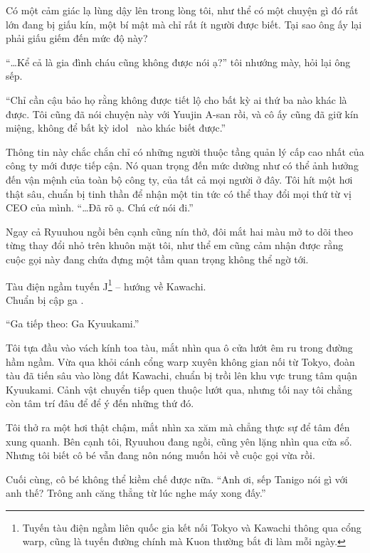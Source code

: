 \documentclass[../main.tex]{subfiles}
\begin{document}
Có một cảm giác lạ lùng dậy lên trong lòng tôi, như thể có một chuyện gì đó rất lớn đang bị giấu kín, một bí mật mà chỉ rất ít người được biết. Tại sao ông ấy lại phải giấu giếm đến mức độ này?

``\dots Kể cả là gia đình cháu cũng không được nói ạ?'' tôi nhướng mày, hỏi lại ông sếp.

``Chỉ cần cậu bảo họ rằng không được tiết lộ cho bất kỳ ai thứ ba nào khác là được. Tôi cũng đã nói chuyện này với Yuujin A-san rồi, và cô ấy cũng đã giữ kín miệng, không để bất kỳ idol \hll\ nào khác biết được.''

Thông tin này chắc chắn chỉ có những người thuộc tầng quản lý cấp cao nhất của công ty mới được tiếp cận. Nó quan trọng đến mức dường như có thể ảnh hưởng đến vận mệnh của toàn bộ công ty, của tất cả mọi người ở đây. Tôi hít một hơi thật sâu, chuẩn bị tinh thần để nhận một tin tức có thể thay đổi mọi thứ từ vị CEO của mình. ``\dots Đã rõ ạ. Chú cứ nói đi.''

Ngay cả Ryuuhou ngồi bên cạnh cũng nín thở, đôi mắt hai màu mở to dõi theo từng thay đổi nhỏ trên khuôn mặt tôi, như thể em cũng cảm nhận được rằng cuộc gọi này đang chứa đựng một tầm quan trọng không thể ngờ tới.

\ct

\begin{center}
  Tàu điện ngầm tuyến J\footnote{Tuyến tàu điện ngầm liên quốc gia kết nối Tokyo và Kawachi thông qua cổng warp, cũng là tuyến đường chính mà Kuon thường bắt đi làm mỗi ngày.} -- hướng về Kawachi.\\
  Chuẩn bị cập ga .
\end{center}


``Ga tiếp theo: Ga Kyuukami.''

Tôi tựa đầu vào vách kính toa tàu, mắt nhìn qua ô cửa lướt êm ru trong đường hầm ngầm. Vừa qua khỏi cánh cổng warp xuyên không gian nối từ Tokyo, đoàn tàu đã tiến sâu vào lòng đất Kawachi, chuẩn bị trồi lên khu vực trung tâm quận Kyuukami. Cảnh vật chuyển tiếp quen thuộc lướt qua, nhưng tối nay tôi chẳng còn tâm trí đâu để để ý đến những thứ đó.

Tôi thở ra một hơi thật chậm, mắt nhìn xa xăm mà chẳng thực sự để tâm đến xung quanh. Bên cạnh tôi, Ryuuhou đang ngồi, cũng yên lặng nhìn qua cửa sổ. Nhưng tôi biết cô bé vẫn đang nôn nóng muốn hỏi về cuộc gọi vừa rồi.

Cuối cùng, cô bé không thể kiềm chế được nữa. ``Anh ơi, sếp Tanigo nói gì với anh thế? Trông anh căng thẳng từ lúc nghe máy xong đấy.''
\end{document}

